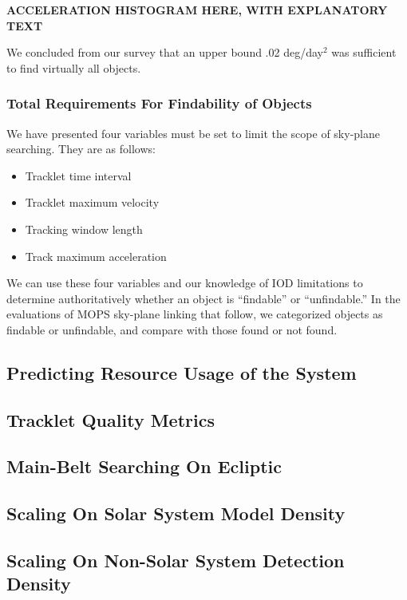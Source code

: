 \documentclass[12pt,preprint]{aastex}
\begin{document}
\textbf{ACCELERATION HISTOGRAM HERE, WITH EXPLANATORY TEXT}

We concluded from our survey that an upper bound .02 deg/day$^2$ was
sufficient to find virtually all objects.

\subsubsection{Total Requirements For Findability of Objects}

We have presented four variables must be set to limit the scope of
sky-plane searching. They are as follows:

\begin{itemize}
\item Tracklet time interval
\item Tracklet maximum velocity
\item Tracking window length
\item Track maximum acceleration
\end{itemize}

We can use these four variables and our knowledge of IOD limitations
to determine authoritatively whether an object is ``findable'' or
``unfindable.''  In the evaluations of MOPS sky-plane linking that
follow, we categorized objects as findable or unfindable, and compare
with those found or not found.


\subsection{Predicting Resource Usage of the System}

\subsection{Tracklet Quality Metrics}

\subsection{Main-Belt Searching On Ecliptic}

\subsection{Scaling On Solar System Model Density}

\subsection{Scaling On Non-Solar System Detection Density}
\end{document}
